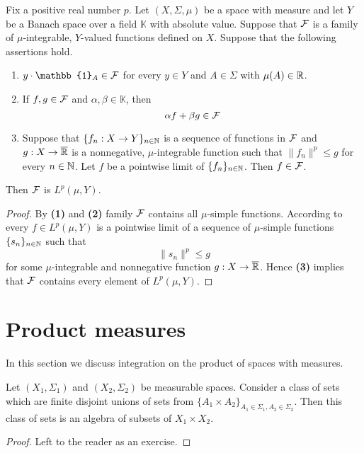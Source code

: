 \begin{proposition}\label{proposition:measurable_induction_for_banach_valued}
    Fix a positive real number $p$. Let $(X,\Sigma,\mu)$ be a space with measure and let $Y$ be a Banach space over a field $\mathbb{K}$ with absolute value. Suppose that ${\mathcal F}$ is a family of $\mu$-integrable, $Y$-valued functions defined on $X$. Suppose that the following assertions hold.
    \begin{enumerate}[label=\emph{\textbf{(\arabic*)}}, leftmargin=*]
        \item $y\cdot \mathbb{1}_A\in \cF$ for every $y\in Y$ and $A\in \Sigma$ with $\mu(A)\in {\mathbb R}$.
        \item If $f, g\in {\mathcal F}$ and $\alpha, \beta\in \mathbb{K}$, then
              $$\alpha f + \beta g\in {\mathcal F}$$
        \item Suppose that $\{f_n:X\rightarrow Y\}_{n\in {\mathbb N}}$ is a sequence of functions in ${\mathcal F}$ and $g:X\rightarrow \overline{{\mathbb R}}$ is a nonnegative, $\mu$-integrable function such that $\lVert f_n\rVert^p \leq g$ for every $n\in {\mathbb N}$. Let $f$ be a pointwise limit of $\{f_n\}_{n\in {\mathbb N}}$. Then $f\in {\mathcal F}$.
    \end{enumerate}
    Then ${\mathcal F}$ is $L^p(\mu,Y)$.
\end{proposition}
\begin{proof}
    By \textbf{(1)} and \textbf{(2)} family ${\mathcal F}$ contains all $\mu$-simple functions. According to \cite{Integration} every $f \in L^p(\mu,Y)$ is a pointwise limit of a sequence of $\mu$-simple functions $\{s_n\}_{n\in {\mathbb N}}$ such that
    $$\lVert s_n\rVert^p \leq g$$
    for some $\mu$-integrable and nonnegative function $g:X\rightarrow \overline{{\mathbb R}}$. Hence \textbf{(3)} implies that ${\mathcal F}$ contains every element of $L^p(\mu,Y)$.
\end{proof}

\section{Product measures}
\noindent
In this section we discuss integration on the product of spaces with measures.

\begin{fact}\label{fact:product_algebra}
    Let $(X_1,\Sigma_1)$ and $(X_2,\Sigma_2)$ be measurable spaces. Consider a class of sets which are finite disjoint unions of sets from $\big\{A_1\times A_2\big\}_{A_1\in \Sigma_1,A_2\in \Sigma_2}$. Then this class of sets is an algebra of subsets of $X_1\times X_2$.
\end{fact}
\begin{proof}
    Left to the reader as an exercise.
\end{proof}

